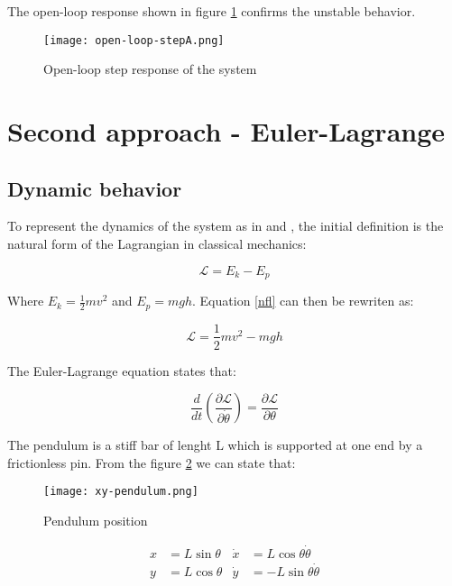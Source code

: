The open-loop response shown in figure \ref{fig:openrespA} confirms the unstable behavior.

\begin{figure}[h]
	\centering
	\texttt{[image: open-loop-stepA.png]}
	\caption{Open-loop step response of the system}\label{fig:openrespA}
\end{figure}

\section{Second approach - Euler-Lagrange}

\subsection{Dynamic behavior}

To represent the dynamics of the system as in \cite{JER12} and \cite{LUN02}, the initial definition is the natural form of the Lagrangian in classical mechanics:

\begin{equation} \label{nfl}
	\mathcal{L}=E_k-E_p
\end{equation}

Where $E_k=\frac{1}{2}mv^2$ and $E_p=mgh$. Equation \ref{nfl} can then be rewriten as:

\begin{equation} \label{nflr}
	\mathcal{L}=\frac{1}{2}mv^2-mgh
\end{equation}

The Euler-Lagrange equation states that:

\begin{equation} \label{ele}
	\frac{d}{dt}\left( \frac{\partial\mathcal{L}}{\partial\dot{\theta}} \right)=\frac{\partial\mathcal{L}}{\partial\theta}
\end{equation}

The pendulum is a stiff bar of lenght L which is supported at one end by a frictionless pin. From the figure \ref{fig:xypend} we can state that:

\begin{figure}[h]
	\centering
	\texttt{[image: xy-pendulum.png]}
	\caption{Pendulum position}\label{fig:xypend}
\end{figure}

\begin{equation} \label{coord}
	\begin{aligned}
		x&=L\sin{\theta} & \dot{x}&=L\cos{\theta}\dot{\theta}\\
		y&=L\cos{\theta} & \dot{y}&=-L\sin{\theta}\dot{\theta}
	\end{aligned}
\end{equation}


